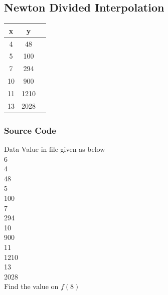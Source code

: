\documentclass{article}
\begin{document}
\subsection{Newton Divided Interpolation}
\begin{center}
\begin{tabular}{ |c|c|c| } 
\hline
 x & y\\
 \hline
 4 & 48  \\  \hline
 5 & 100  \\  \hline
 7 & 294 \\  \hline
 10 & 900  \\  \hline
 11 & 1210  \\  \hline
 13 & 2028 \\ \hline

 
 \hline
\end{tabular}
\end{center}
\subsubsection{Source Code}
Data Value in file given as below\\
6\\
4\\
48\\
5\\
100\\
7\\
294\\
10\\
900\\
11\\
1210\\
13\\
2028\\
Find the value on $f(8)$\\
\end{document}

